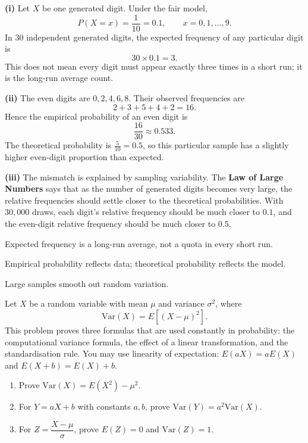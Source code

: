 \begin{solution}
\textbf{(i)} Let $X$ be one generated digit. Under the fair model,
\[
P(X=x)=\frac{1}{10}=0{.}1,\qquad x=0,1,\ldots,9.
\]
In $30$ independent generated digits, the expected frequency of any particular digit is
\[
30\times0{.}1=3.
\]
This does not mean every digit must appear exactly three times in a short run; it is the long-run average count.

\textbf{(ii)} The even digits are $0,2,4,6,8$. Their observed frequencies are
\[
2+3+5+4+2=16.
\]
Hence the empirical probability of an even digit is
\[
\frac{16}{30}\approx0{.}533.
\]
The theoretical probability is $\frac{5}{10}=0{.}5$, so this particular sample has a slightly higher even-digit proportion than expected.

\textbf{(iii)} The mismatch is explained by sampling variability. The \textbf{Law of Large Numbers} says that as the number of generated digits becomes very large, the relative frequencies should settle closer to the theoretical probabilities. With $30{,}000$ draws, each digit's relative frequency should be much closer to $0{.}1$, and the even-digit relative frequency should be much closer to $0{.}5$.
\end{solution}

\begin{takeaways}
\item Expected frequency is a long-run average, not a quota in every short run.
\item Empirical probability reflects data; theoretical probability reflects the model.
\item Large samples smooth out random variation.
\end{takeaways}

\begin{problem}
Let $X$ be a random variable with mean $\mu$ and variance $\sigma^2$, where
\[
\mathrm{Var}(X)=E[(X-\mu)^2].
\]
This problem proves three formulas that are used constantly in probability: the computational variance formula, the effect of a linear transformation, and the standardisation rule. You may use linearity of expectation: $E(aX)=aE(X)$ and $E(X+b)=E(X)+b$.
\begin{enumerate}[label=\textbf{(\roman*)}]
  \item Prove $\mathrm{Var}(X)=E(X^2)-\mu^2$.
  \item For $Y=aX+b$ with constants $a,b$, prove $\mathrm{Var}(Y)=a^2\mathrm{Var}(X)$.
  \item For $Z=\dfrac{X-\mu}{\sigma}$, prove $E(Z)=0$ and $\mathrm{Var}(Z)=1$.
\end{enumerate}
\end{problem}


